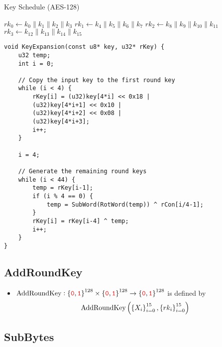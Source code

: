 \begin{algorithm}[H]
	\caption{Key Schedule (AES-128)}
	
	\BlankLine
	\( rk_0 \leftarrow k_0\parallel k_1\parallel k_2 \parallel k_3 \)\;
	\( rk_1 \leftarrow k_4\parallel k_5\parallel k_6 \parallel k_7 \)\;
	\( rk_2 \leftarrow k_8\parallel k_9\parallel k_{10} \parallel k_{11} \)\;
	\( rk_3 \leftarrow k_{12}\parallel k_{13}\parallel k_{14} \parallel k_{15} \)\;
\end{algorithm}
\vspace{24pt}
\begin{lstlisting}[style=C, caption={AES Key Expansion},captionpos=t]
void KeyExpansion(const u8* key, u32* rKey) {
	u32 temp;
	int i = 0;
	
	// Copy the input key to the first round key
	while (i < 4) {
		rKey[i] = (u32)key[4*i] << 0x18 | 
		(u32)key[4*i+1] << 0x10 | 
		(u32)key[4*i+2] << 0x08 | 
		(u32)key[4*i+3];
		i++;
	}
	
	i = 4;
	
	// Generate the remaining round keys
	while (i < 44) {
		temp = rKey[i-1];
		if (i % 4 == 0) {
			temp = SubWord(RotWord(temp)) ^ rCon[i/4-1];
		}
		rKey[i] = rKey[i-4] ^ temp;
		i++;
	}
}
\end{lstlisting}

\newpage
\subsection{AddRoundKey}
\begin{itemize}
	\item $\text{AddRoundKey}:\set{\textcolor{red}{\texttt{0}},\textcolor{red}{\texttt{1}}}^{128}\times\set{\textcolor{red}{\texttt{0}},\textcolor{red}{\texttt{1}}}^{128}\to\set{\textcolor{red}{\texttt{0}},\textcolor{red}{\texttt{1}}}^{128}$ is defined by \[
	\text{AddRoundKey}\left(\set{X_i}_{i=0}^{15},\set{rk_i}_{i=0}^{15}\right)
	\] 
\end{itemize}
\subsection{SubBytes}
